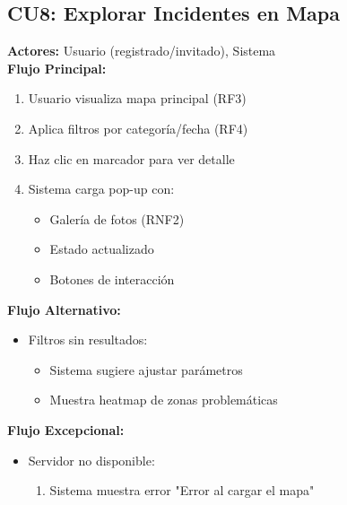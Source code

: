 \begin{multicols}{2}
\subsection*{CU8: Explorar Incidentes en Mapa}
\textbf{Actores:} Usuario (registrado/invitado), Sistema\\
\textbf{Flujo Principal:}
\begin{enumerate}
    \item Usuario visualiza mapa principal (RF3)
    \item Aplica filtros por categoría/fecha (RF4)
    \item Haz clic en marcador para ver detalle
    \item Sistema carga pop-up con:
    \begin{itemize}
        \item Galería de fotos (RNF2)
        \item Estado actualizado
        \item Botones de interacción
    \end{itemize}
\end{enumerate}

\textbf{Flujo Alternativo:}
\begin{itemize}
    \item Filtros sin resultados:
    \begin{itemize}
        \item Sistema sugiere ajustar parámetros
        \item Muestra heatmap de zonas problemáticas
    \end{itemize}
\end{itemize}

\textbf{Flujo Excepcional:}
\begin{itemize}
    \item Servidor no disponible:
    \begin{enumerate}
        \item Sistema muestra error "Error al cargar el mapa"
    \end{enumerate}
\end{itemize}


\end{multicols}
